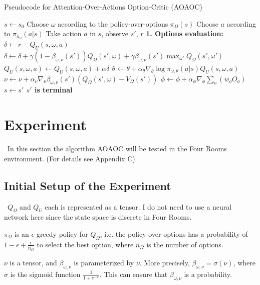 \documentclass{article}
\begin{document}
	\begin{algorithm}[H]
	\caption{Pseudocode for Attention-Over-Actions Option-Critic (AOAOC)}
	\begin{algorithmic}
		\vspace{1.5mm}
		\State $s \leftarrow s_0$
		\State Choose $\omega$ according to the policy-over-options $\pi_\Omega(s)$
		\Repeat
		\State Choose $a$ according to $\pi_{h_\omega}(a|s)$
		\State Take action $a$ in $s$, observe $s'$, $r$\vspace{3mm}
		\State \bfseries{1. Options evaluation:}
		\State \normalfont $\delta \leftarrow r - Q_U(s,\omega,a)$
		\State $\delta \leftarrow \delta+\gamma(1-\beta_{\omega,\nu}(s'))Q_\Omega(s',\omega)+\gamma \beta_{\omega,\nu}(s')\max_{\omega'}Q_\Omega(s',\omega')$
		\EndIf
		\State $Q_U(s,\omega,a)\leftarrow Q_U(s,\omega,a) + \alpha \delta$
		\vspace{3mm}
		\State $\theta \leftarrow \theta + \alpha_\theta \nabla_\theta \log \pi_{\omega, \theta}(a|s)Q_U(s,\omega,a)$
		\State $\nu \leftarrow \nu + \alpha_\nu \nabla_\nu \beta_{\omega,\nu}(s')(Q_\Omega(s',\omega)-V_\Omega(s'))$
		\State \normalfont $\phi \leftarrow \phi + \alpha_\phi \nabla_\phi \sum_{o} (w_o O_o)$
		\EndIf
		\State $s \leftarrow s'$
		\Until $s'$ is terminal	
	\end{algorithmic}
	\end{algorithm}
	\section{Experiment}
	\qquad \ In this section the algorithm AOAOC will be tested in the Four Rooms environment. (For details see Appendix C)
	\subsection*{Initial Setup of the Experiment}
	\qquad \ $Q_\Omega$ and $Q_U$ each is represented as a tensor. I do not need to use a neural network here since the state space is discrete in Four Rooms.
	
	\quad $\pi_\Omega$ is an $\epsilon$-greedy policy for $Q_\Omega$, i.e. the policy-over-options has a probability of $1-\epsilon+\frac{\epsilon}{n_\Omega}$ to select the best option, where $n_\Omega$ is the number of options.
	
	\quad $\nu$ is a tensor, and $\beta_{\omega, \nu}$ is parameterized by $\nu$. More precisely, $\beta_{\omega, \nu} = \sigma(\nu)$, where $\sigma$ is the sigmoid function $\frac{1}{1+e^{-x}}$. This can ensure that $\beta_{\omega, \nu}$ is a probability.
	
\end{document}
